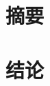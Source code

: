 \documentclass{ctexbook}
\begin{document}
  \chapter*{摘要}
  \zhlipsum[1]%
  \chapter{结论}
  \zhlipsum[4]%
\end{document}
